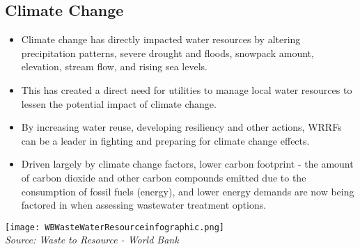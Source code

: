 \subsection{Climate Change} 
\begin{itemize}
\item Climate change has directly impacted water resources by altering precipitation patterns, severe drought and floods, snowpack amount, elevation, stream flow, and rising sea levels. 
\item This has created a direct need for utilities to manage local water resources to lessen the potential impact of climate change. 
\item By increasing water reuse, developing resiliency and other actions, WRRFs can be a leader in fighting and preparing for climate change effects.
\item Driven largely by climate change factors, lower carbon footprint - the amount of carbon dioxide and other carbon compounds emitted due to the consumption of fossil fuels (energy), and lower energy demands are now being factored in when assessing wastewater treatment options.
\end{itemize}
\newpage
\begin{center}
\texttt{[image: WBWasteWaterResourceinfographic.png]}\\
\emph{Source:  Waste to Resource - World Bank}\\
\end{center}








